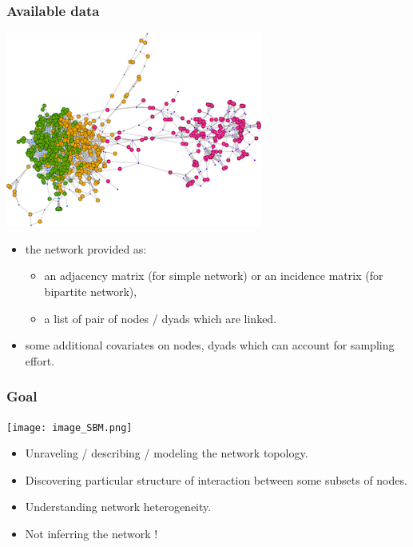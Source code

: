 \documentclass[compress,10pt]{beamer}
\begin{document}
\begin{frame}\frametitle{Available data}
 
\begin{center}
 \includegraphics[scale=1]{plots/image_SBM.png}
\end{center}

\begin{itemize}
 \item  the network provided as:
\begin{itemize}
 \item an adjacency matrix (for simple network) or an incidence matrix (for bipartite network),
 \item a list of pair of nodes / dyads which are linked.
\end{itemize}

\item some additional covariates on nodes, dyads which can account for sampling effort.
 \end{itemize}






\end{frame}

\begin{frame}\frametitle{Goal}

 
\begin{center}
 \texttt{[image: image\_SBM.png]}
\end{center}

\begin{itemize}
 \item Unraveling / describing / modeling the network topology. 
 \item Discovering particular structure of interaction between some subsets of nodes.
 \item Understanding network heterogeneity.
 \item Not inferring the network !
 \end{itemize}


\end{frame}
\end{document}
